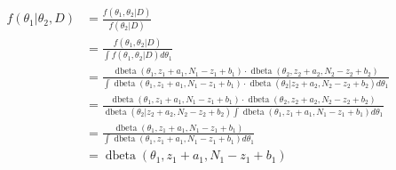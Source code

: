 \documentclass[
  12pt,
]{book}
\theoremstyle{definition}
\theoremstyle{definition}
\theoremstyle{definition}
\theoremstyle{remark}
\begin{document}
\begin{align*}
f\left(\theta_{1} | \theta_{2}, D\right) 
&= \frac{f\left(\theta_{1}, \theta_{2} | D\right)}{f\left(\theta_{2} | D\right)}  \\
&= \frac{f\left(\theta_{1}, \theta_{2} | D\right)}{\int f\left(\theta_{1}, \theta_{2} | D\right)d \theta_{1}}   \\
&=\frac{\operatorname{dbeta}\left(\theta_{1}, z_{1}+a_{1}, N_{1}-z_{1}+b_{1}\right) \cdot \operatorname{dbeta}\left(\theta_{2}, z_{2}+a_{2}, N_{2}-z_{2}+b_{2}\right)}{\int  \operatorname{dbeta}\left(\theta_{1}, z_{1}+a_{1}, N_{1}-z_{1}+b_{1}\right) \cdot \operatorname{dbeta}\left(\theta_{2} | z_{2}+a_{2}, N_{2}-z_{2}+b_{2}\right)d \theta_{1}} \\
&=\frac{\operatorname{dbeta}\left(\theta_{1}, z_{1}+a_{1}, N_{1}-z_{1}+b_{1}\right) \cdot \operatorname{dbeta}\left(\theta_{2}, z_{2}+a_{2}, N_{2}-z_{2}+b_{2}\right)}{\operatorname{dbeta}\left(\theta_{2} | z_{2}+a_{2}, N_{2}-z_{2}+b_{2}\right) \int  \operatorname{dbeta}\left(\theta_{1}, z_{1}+a_{1}, N_{1}-z_{1}+b_{1}\right)d \theta_{1}} \\
&=\frac{\operatorname{dbeta}\left(\theta_{1}, z_{1}+a_{1}, N_{1}-z_{1}+b_{1}\right)}{\int  \operatorname{dbeta}\left(\theta_{1}, z_{1}+a_{1}, N_{1}-z_{1}+b_{1}\right)d \theta_{1}} \\
&=\operatorname{dbeta}\left(\theta_{1}, z_{1}+a_{1}, N_{1}-z_{1}+b_{1}\right)
\end{align*}
\end{document}
